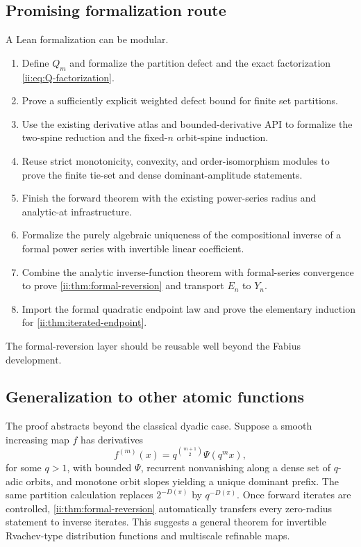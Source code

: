 \subsection{Promising formalization route}

A Lean formalization can be modular.
\begin{enumerate}[label=\arabic*.]
 \item Define $Q_m$ and formalize the partition defect and the exact factorization
 \eqref{ii:eq:Q-factorization}.
 \item Prove a sufficiently explicit weighted defect bound for finite set partitions.
 \item Use the existing derivative atlas and bounded-derivative API to formalize the
 two-spine reduction and the fixed-$n$ orbit-spine induction.
 \item Reuse strict monotonicity, convexity, and order-isomorphism modules to prove the
 finite tie-set and dense dominant-amplitude statements.
 \item Finish the forward theorem with the existing power-series radius and analytic-at
 infrastructure.
 \item Formalize the purely algebraic uniqueness of the compositional inverse of a
 formal power series with invertible linear coefficient.
 \item Combine the analytic inverse-function theorem with formal-series convergence to
 prove \cref{ii:thm:formal-reversion} and transport $E_n$ to $Y_n$.
 \item Import the formal quadratic endpoint law and prove the elementary induction for
 \cref{ii:thm:iterated-endpoint}.
\end{enumerate}
The formal-reversion layer should be reusable well beyond the Fabius development.

\subsection{Generalization to other atomic functions}

The proof abstracts beyond the classical dyadic case.  Suppose a smooth increasing map
$f$ has derivatives
\begin{equation}
 f^{(m)}(x)=q^{\binom{m+1}{2}}\Psi(q^m x),
 \label{ii:eq:q-atomic-derivatives}
\end{equation}
for some $q>1$, with bounded $\Psi$, recurrent nonvanishing along a dense set of
$q$-adic orbits, and monotone orbit slopes yielding a unique dominant prefix.  The same
partition calculation replaces $2^{-D(\pi)}$ by $q^{-D(\pi)}$.  Once forward iterates
are controlled, \cref{ii:thm:formal-reversion} automatically transfers every zero-radius
statement to inverse iterates.  This suggests a general theorem for invertible
Rvachev-type distribution functions and multiscale refinable maps.

